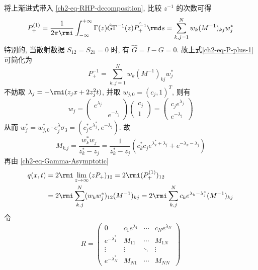 将上渐进式带入 \eqref{ch2-eq-RHP-decomposition}, 比较 $ z^{-1} $ 的次数可得
\begin{equation}
    P_{+}^{(1)} = \frac{1}{2 \pi \rmi} \int_{-\infty}^{+\infty} \Gamma(z) \hat{G} \Gamma^{-1}(z) \hat{P_{+}^{-1}} \rmd s = \sum_{k,j = 1}^{N} w_{k} (M^{-1})_{kj} w_{j}^{*} \label{ch2-eq-P-plus-1}
\end{equation}
特别的, 当散射数据 $ S_{12} = S_{21} = 0 $ 时, 有 $ \hat{G} = I - G = 0 $. 故上式\eqref{ch2-eq-P-plus-1} 可简化为
\begin{equation}
    P_{+}^{-1} = \sum_{k,j = 1}^{N} w_{k}(M^{-1})_{kj} w_{j}^{*}
\end{equation}
不妨取 $ \lambda_{j} = - \rmi (z_{j}x + 2 z_{j}^{2} t) $, 并取 $ w_{j,0} = (c_{j},1)^{T} $, 则有
\begin{equation}
    w_{j} = \begin{pmatrix}
        e^{\lambda_{j}} & \\ & e^{-\lambda_{j}}
    \end{pmatrix} \begin{pmatrix}
        c_{j} \\ 1
    \end{pmatrix} = \begin{pmatrix}
        c_{j} e^{\lambda_{j}} \\ e^{-\lambda_{j}}
    \end{pmatrix}
\end{equation}
从而 $ w_{j}^{*} = w_{j,0}^{*} \cdot e^\lambda_{j} \sigma_{3} = (c_{j}^{*}e^{\lambda_{j}^{*}}, e^{-\lambda_{j}})$. 故
\begin{equation}
    M_{k.j} = \frac{w_{k}^{*}w_{j}}{z_{k}^{*}- z_{j}} = \frac{1}{z_{k}^{*} - z_{j}} (c_{k}^{*}c_{j} e^{\lambda_{k}^{*} + \lambda_{j}} + e^{-\lambda_{k} - \lambda_{j}})
\end{equation}
再由 \eqref{ch2-eq-Gamma-Asymptotic}
\begin{equation}
    \begin{aligned}
        q(x,t) & = 2 \rmi \lim_{z \to \infty} (zP_{+})_{12} = 2 \rmi (P_{+}^{(1)})_{12}                                                                                             \\
               & = 2 \rmi \sum_{k,j}^{N}(w_{k}w_{j}^{*})_{12}(M^{-1})_{kj} = 2 \rmi \sum_{k,j}^{N} c_{k}e^{\lambda_{k} - \lambda_{j}^{*}}(M^{-1})_{kj} \label{ch2-eq-NLS-N-soliton}
    \end{aligned}
\end{equation}
令
\begin{equation}
    R = \begin{pmatrix}
        0                    & c_{1}e^{\lambda_{1}} & \cdots & c_{N}e^{\lambda_{N}} \\
        e^{-\lambda_{1}^{*}} & M_{11}               & \cdots & M_{1N}               \\
        \vdots               & \vdots               & \ddots & \vdots               \\
        e^{-\lambda_{N}^{*}} & M_{N1}               & \cdots & M_{NN}
    \end{pmatrix}
\end{equation}
